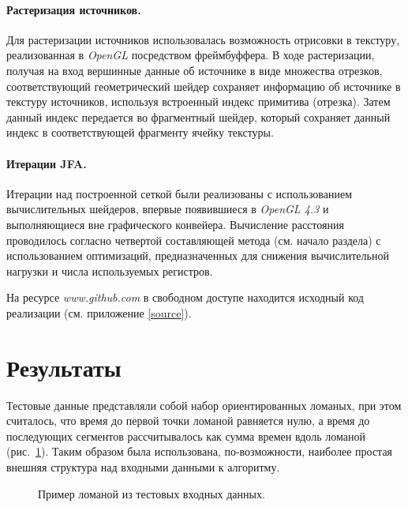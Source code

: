 \documentclass[12pt]{article}
\begin{document}
\paragraph{Растеризация источников.} Для растеризации источников 
использовалась возможность отрисовки в текстуру, реализованная в \emph{OpenGL}
посредством фреймбуффера. В ходе растеризации, получая на вход вершинные данные об
источнике в виде множества отрезков, соответствующий геометрический шейдер 
сохраняет информацию об источнике в текстуру источников, используя встроенный 
индекс примитива (отрезка). Затем данный индекс передается во фрагментный шейдер,
который сохраняет данный индекс в соответствующей фрагменту ячейку текстуры.

\paragraph{Итерации JFA.} Итерации над построенной сеткой были
реализованы с использованием вычислительных шейдеров,
впервые появившиеся в \emph{OpenGL 4.3} и выполняющиеся вне
графического конвейера. Вычисление расстояния проводилось согласно 
четвертой составляющей метода (см. начало раздела) с использованием 
оптимизаций, предназначенных для снижения вычислительной нагрузки и 
числа используемых регистров.

На ресурсе \emph{www.github.com} в свободном доступе находится исходный код
реализации (см. приложение \ref{source}).

\section{Результаты}
Тестовые данные представляли собой набор ориентированных ломаных, при этом
считалось, что время до первой точки ломаной равняется нулю, а время до 
последующих сегментов рассчитывалось как сумма времен вдоль ломаной (рис.~\ref{fig_input}).
Таким образом была использована, по-возможности, наиболее простая внешняя структура
над входными данными к алгоритму.
\begin{figure}
\label{fig_input}
\begin{center}
\end{center}
\caption{Пример ломаной из тестовых входных данных.}
\end{figure}
\end{document}
